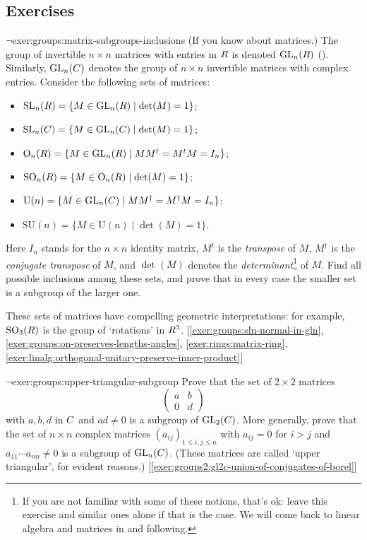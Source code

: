 \subsection*{Exercises}

\begin{exer}{$\lnot$}{exer:groups:matrix-subgroups-inclusions}
  (If you know about matrices.) The group of invertible $n \times n$
  matrices with entries in $R$ is denoted $\mathrm{GL}_n(R)$
  (). Similarly, $\mathrm{GL}_n(C)$
  denotes the group of $n \times n$ invertible matrices with complex
  entries. Consider the following sets of matrices:
  \begin{itemize}
  \item
    $\mathrm{SL}_n(R) = \{M \in \mathrm{GL}_n(R) \mid \det(M) =
    1\}$;
  \item
    $\mathrm{SL}_n(C) = \{M \in \mathrm{GL}_n(C) \mid \det(M) =
    1\}$;
  \item
    $\mathrm{O}_n(R) = \{M \in \mathrm{GL}_n(R) \mid MM^t = M^tM =
    I_n\}$;
  \item
    $\mathrm{SO}_n(R) = \{M \in \mathrm{O}_n(R) \mid \det(M) = 1\}$;
  \item
    $\mathrm{U}(n) = \{M \in \mathrm{GL}_n(C) \mid MM^\dagger =
    M^\dagger M = I_n\}$;
  \item $\mathrm{SU}(n) = \{M \in \mathrm{U}(n) \mid \det(M) = 1\}$.
  \end{itemize}
  Here $I_n$ stands for the $n \times n$ identity matrix, $M^t$ is the
  \emph{transpose} of $M$, $M^\dagger$ is the \emph{conjugate
    transpose} of $M$, and $\det(M)$ denotes the
  \emph{determinant}\footnote{If you are not familiar with some of
    these notions, that's ok: leave this exercise and similar ones
    alone if that is the case. We will come back to linear algebra and
    matrices in  and following.} of $M$. Find all
  possible inclusions among these sets, and prove that in every case
  the smaller set is a subgroup of the larger one.

  These sets of matrices have compelling geometric interpretations:
  for example, $\mathrm{SO}_3(R)$ is the group of `rotations' in
  $R^3$. [\ref{exer:groups:sln-normal-in-gln},
  \ref{exer:groups:on-preserves-lengths-angles},
  \ref{exer:rings:matrix-ring},
  \ref{exer:linalg:orthogonal-unitary-preserve-inner-product}]
\end{exer}
\begin{exer}{$\lnot$}{exer:groups:upper-triangular-subgroup}
  Prove that the set of $2 \times 2$ matrices
  \[
    \begin{pmatrix} a & b \\ 0 & d \end{pmatrix}
  \]
  with $a, b, d$ in $C$ and $ad \neq 0$ is a subgroup of
  $\mathrm{GL}_2(C)$. More generally, prove that the set of
  $n \times n$ complex matrices $(a_{ij})_{1 \leq i,j \leq n}$ with
  $a_{ij} = 0$ for $i > j$ and $a_{11} \cdots a_{nn} \neq 0$ is a
  subgroup of $\mathrm{GL}_n(C)$. (These matrices are called `upper
  triangular', for evident reasons.)
  [\ref{exer:groups2:gl2c-union-of-conjugates-of-borel}]
\end{exer}

